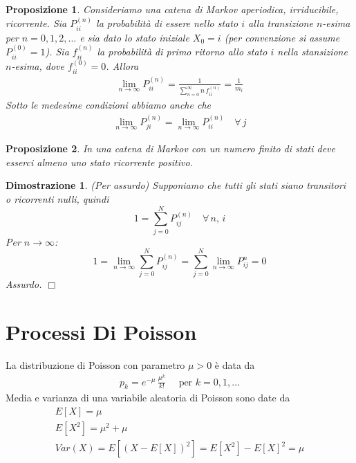 \documentclass{article}
\newtheorem{proposizione}{Proposizione}[section]
\newtheorem*{dimostrazione*}{Dimostrazione}
\newcommand*{\QED}{\hfill\ensuremath{\Box}}
\begin{document}
\begin{proposizione}
\label{mc_teorema_limite_fondamentale}
Consideriamo una catena di Markov aperiodica, irriducibile, ricorrente. Sia $P_{ii}^{(n)}$ la probabilità di essere nello stato $i$ alla transizione $n$-esima per $n=0,1,2,\hdots$ e sia dato lo stato iniziale $X_0 = i$ (per convenzione si assume $P_{ii}^{(0)} = 1$). Sia $f_{ii}^{(n)}$ la probabilità di primo ritorno allo stato $i$ nella stansizione $n$-esima, dove $f_{ii}^{(0)} = 0$. Allora
\begin{align}
\lim_{n\to \infty} P_{ii}^{(n)} = \frac{1}{\sum_{n=0}^{\infty} n\,f_{ii}^{(n)}} = \frac{1}{m_i}
\end{align}
Sotto le medesime condizioni abbiamo anche che
\begin{align}
\lim_{n\to\infty} P_{ji}^{(n)} = \lim_{n\to\infty} P_{ii}^{(n)}\quad \forall\,j
\end{align}
\end{proposizione}

\begin{proposizione}
\label{mc_numero_finito_di stati}
In una catena di Markov con un numero finito di stati deve esserci almeno uno stato ricorrente positivo.
\end{proposizione}
\begin{dimostrazione*}
(Per assurdo) Supponiamo che tutti gli stati siano transitori o ricorrenti nulli, quindi
$$
1 = \sum_{j=0}^N P_{ij}^{(n)}\quad \forall\,n,\,i
$$
Per $n \to \infty$:
$$
1 = \lim_{n \to \infty} \sum_{j=0}^N P_{ij}^{(n)}=\sum_{j=0}^N \lim_{n\to \infty} P_{ij}^{n} = 0
$$
Assurdo.
\QED
\end{dimostrazione*}


\newpage
\section{Processi Di Poisson}


La distribuzione di Poisson con parametro $\mu > 0$ è data da
\begin{align}
\label{pp_distribuzione_poisson}
p_k = e^{-\mu}\,\frac{\mu^k}{k!}\quad \text{ per } k = 0,1,\hdots
\end{align}
Media e varianza di una variabile aleatoria di Poisson sono date da
\begin{gather*}
E[X] = \mu\\
E[X^2] = \mu^2 + \mu\\
Var(X) = E[(X - E[X])^2] = E[X^2] - E[X]^2 = \mu  
\end{gather*}
\end{document}
